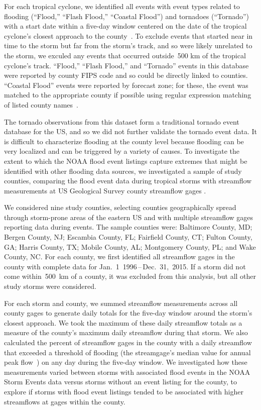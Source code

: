 For each tropical cyclone, we identified all events with event types related to
flooding (``Flood,'' ``Flash Flood,'' ``Coastal Flood'') and tornadoes
(``Tornado'') with a start date within a five-day window centered on the date
of the tropical cyclone's closest approach to the
county~\parencite{hurricaneexposuredata}. To exclude events that started near
in time to the storm but far from the storm's track, and so were likely
unrelated to the storm, we exculed any events that occurred outside~500
\si{\kilo\metre} of the tropical cyclone's track. ``Flood,'' ``Flash Flood,''
and ``Tornado'' events in this database were reported by county \ac{FIPS} code
and so could be directly linked to counties.  ``Coastal Flood'' events were
reported by forecast zone; for these, the event was matched to the appropriate
county if possible using regular expression matching of listed county
names~\parencite{noaastormevents}. 

The tornado observations from this dataset form a traditional tornado event
database for the \ac{US}, and so we did not further validate
the tornado event data. It is difficult to characterize flooding at the county
level because flooding can be very localized and can be triggered by a variety
of causes. To investigate the extent to which the NOAA flood event listings
capture extremes that might be identified with other flooding data sources, we
investigated a sample of study counties, comparing the flood event data during
tropical storms with streamflow measurements at \ac{US} Geological Survey
county streamflow gages \parencite{usgsgages, countyfloods, dataRetrieval}.  

We considered nine study counties, selecting counties geographically spread
through storm-prone areas of the eastern \ac{US} and with multiple streamflow
gages reporting data during events. The sample counties were: Baltimore County,
MD; Bergen County, NJ; Escambia County, FL; Fairfield County, CT; Fulton
County, GA; Harris County, TX; Mobile County, AL; Montgomery County, PL; and
Wake County, NC. For each county, we first identified all streamflow gages in
the county with complete data for Jan.~1~1996\,--\,Dec.~31,~2015. If a storm
did not come within~500~\si{\kilo\metre} of a county, it was excluded from this
analysis, but all other study storms were considered. 

For each storm and county, we summed streamflow measurements across all county
gages to generate daily totals for the five-day window around the storm's
closest approach. We took the maximum of these daily streamflow totals as a
measure of the county's maximum daily streamflow during that storm. We also
calculated the percent of streamflow gages in the county with a daily
streamflow that exceeded a threshold of flooding (the streamgage's median value
for annual peak flow~\parencite{countyfloods}) on any day during the five-day
window. We investigated how these measurements varied between storms with
associated flood events in the NOAA Storm Events data versus storms without an
event listing for the county, to explore if storms with flood event listings
tended to be associated with higher streamflows at gages within the county.

